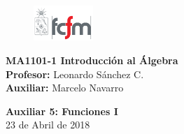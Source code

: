 \documentclass[letterpaper,11pt]{article}
\theoremstyle{plain}
\begin{document}
\newpage
\pagestyle{fancy}
\fancyhf{}

\begin{figure} %
    \vspace{-5mm}
    \includegraphics[width=0.2\textwidth]{img/fcfm2.png}
\end{figure}


\noindent
\textbf{MA1101-1 Introducción al Álgebra}\\
\textbf{Profesor: }Leonardo Sánchez C.\\
\textbf{Auxiliar: }Marcelo Navarro

\begin{center}
{\bf \Large Auxiliar 5: Funciones I}\\
{23 de Abril de 2018}
\end{center}
\end{document}
